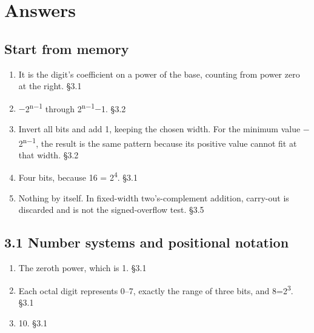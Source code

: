 \documentclass[11pt]{article}
\begin{document}
\clearpage
\section{Answers}
\begin{keepsection}\subsection{Start from memory}

\begin{enumerate}
\item It is the digit’s coefficient on a power of the base, counting from power zero at the right. \hfill{\small\color{FAUblue}§3.1}
\item \ensuremath{-}2\textsuperscript{n\ensuremath{-}1} through 2\textsuperscript{n\ensuremath{-}1}\ensuremath{-}1. \hfill{\small\color{FAUblue}§3.2}
\item Invert all bits and add 1, keeping the chosen width. For the minimum value \ensuremath{-}2\textsuperscript{n\ensuremath{-}1}, the result is the same pattern because its positive value cannot fit at that width. \hfill{\small\color{FAUblue}§3.2}
\item Four bits, because 16 = 2\textsuperscript{4}. \hfill{\small\color{FAUblue}§3.1}
\item Nothing by itself. In fixed-width two’s-complement addition, carry-out is discarded and is not the signed-overflow test. \hfill{\small\color{FAUblue}§3.5}
\end{enumerate}

\end{keepsection}
\begin{keepsection}\subsection{3.1 Number systems and positional notation}

\begin{enumerate}
\item The zeroth power, which is 1. \hfill{\small\color{FAUblue}§3.1}
\item Each octal digit represents 0–7, exactly the range of three bits, and 8=2\textsuperscript{3}. \hfill{\small\color{FAUblue}§3.1}
\item 10. \hfill{\small\color{FAUblue}§3.1}
\end{enumerate}

\end{keepsection}
\end{document}
